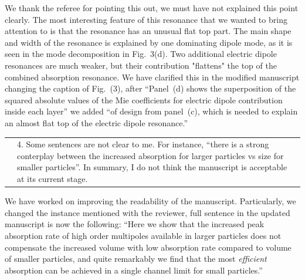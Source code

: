 \documentclass[a4paper]{article}
\begin{document}
We thank the referee for pointing this out, we must have not explained
this point clearly. The most interesting feature of this resonance
that we wanted to bring attention to is that the resonance has an
unusual flat top part. The main shape and width of the resonance is
explained by one dominating dipole mode, as it is seen in the mode
decomposition in Fig.~3(d). Two additional electric dipole resonances
are much weaker, but their contribution "flattens" the top of the
combined absorption resonance. We have clarified this in the modified
manuscript changing the caption of Fig.~(3), after ``Panel~(d) shows
the superposition of the squared absolute values of the Mie
coefficients for electric dipole contribution inside each layer'' we
added ``of design from panel~(c), which is needed to explain an almost
flat top of the electric dipole resonance.''


\begin{tabular}[!H]{l|p{}}
\quad & 4.  Some sentences are not clear to me. For instance, “there
is a strong conterplay between the increased absorption for larger
particles vs size for smaller particles”.  In summary, I do not think
the manuscript is acceptable at its current stage.
\end{tabular}%

We have worked on improving the readability of the
manuscript. Particularly, we changed the instance mentioned with the
reviewer, full sentence in the updated manuscript is now the
following: ``Here we show that the increased peak absorption rate of
high order multipoles available in larger particles does not
compensate the increased volume with low absorption rate compared to
volume of smaller particles, and quite remarkably we find that the
most {\em efficient} absorption can be achieved in a single channel
limit for small particles.''
\end{document}
